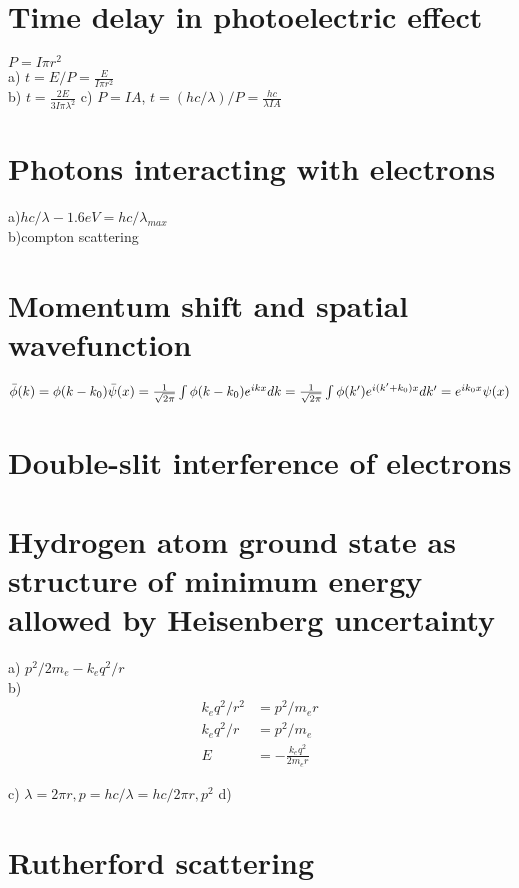 \documentclass{article}
\title{}
\date{}
\newcommand{\<}{\langle}
\renewcommand{\>}{\rangle}
\newcommand{\ff}{\frac{1}{\sqrt{2\pi}}}
\begin{document}
\maketitle

\section{Time delay in photoelectric effect}

$P = I\pi r^2$
\\
a) $t = E/P = \frac{E}{I \pi r^2}$
\\
b) $t = \frac{2 E}{3 I \pi \lambda^2}$
c) $P = IA$, $t = (hc/\lambda)/P = \frac{hc}{\lambda IA}$

\section{Photons interacting with electrons}

a)$hc/\lambda - 1.6eV = hc/\lambda_{max}$
\\
b)compton scattering

\section{Momentum shift and spatial wavefunction}

$\bar\phi(k) = \phi(k-k_0)
\\
\bar\psi(x) = \ff\int\phi(k-k_0) e^{ikx} dk 
\\
=\ff\int\phi(k') e^{i(k'+k_0)x} dk'
\\
=e^{ik_0x}\psi(x)$

\section{Double-slit interference of electrons}
\section{Hydrogen atom ground state as structure of minimum energy allowed by Heisenberg uncertainty}

a) $p^2/2m_e - k_e q^2/r$
\\
b)
\begin{align*}
k_e q^2/r^2 &= p^2 /m_e r \\
k_e q^2/r &= p^2 / m_e \\
E &= -\frac{k_e q^2}{2m_er}
\end{align*}

c)
$\lambda = 2\pi r, p = hc/\lambda = hc/2\pi r, p^2$
d)
\section{Rutherford scattering}
\end{document}
